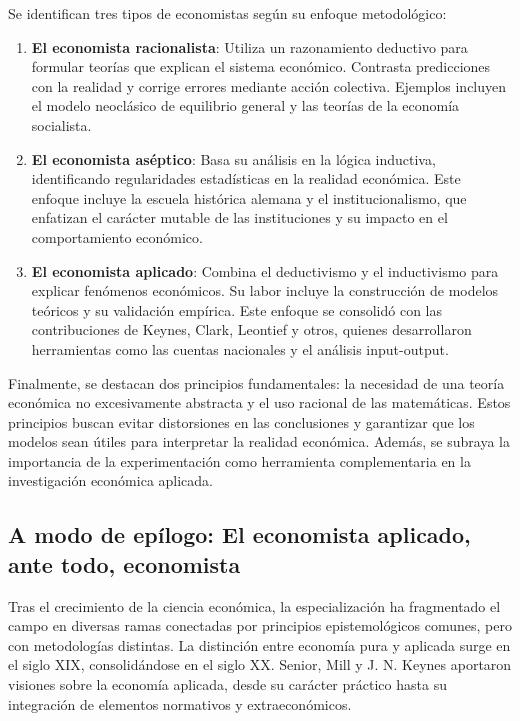 \documentclass[12pt]{report} %
\begin{document}
Se identifican tres tipos de economistas según su enfoque metodológico:

\begin{enumerate}
\def\labelenumi{\arabic{enumi}.}
\item
  \textbf{El economista racionalista}: Utiliza un razonamiento deductivo
  para formular teorías que explican el sistema económico. Contrasta
  predicciones con la realidad y corrige errores mediante acción
  colectiva. Ejemplos incluyen el modelo neoclásico de equilibrio
  general y las teorías de la economía socialista.
\item
  \textbf{El economista aséptico}: Basa su análisis en la lógica
  inductiva, identificando regularidades estadísticas en la realidad
  económica. Este enfoque incluye la escuela histórica alemana y el
  institucionalismo, que enfatizan el carácter mutable de las
  instituciones y su impacto en el comportamiento económico.
\item
  \textbf{El economista aplicado}: Combina el deductivismo y el
  inductivismo para explicar fenómenos económicos. Su labor incluye la
  construcción de modelos teóricos y su validación empírica. Este
  enfoque se consolidó con las contribuciones de Keynes, Clark, Leontief
  y otros, quienes desarrollaron herramientas como las cuentas
  nacionales y el análisis input-output.
\end{enumerate}

Finalmente, se destacan dos principios fundamentales: la necesidad de
una teoría económica no excesivamente abstracta y el uso racional de las
matemáticas. Estos principios buscan evitar distorsiones en las
conclusiones y garantizar que los modelos sean útiles para interpretar
la realidad económica. Además, se subraya la importancia de la
experimentación como herramienta complementaria en la investigación
económica aplicada.

\hypertarget{a-modo-de-epuxedlogo-el-economista-aplicado-ante-todo-economista}{%
\subsection{A modo de epílogo: El economista aplicado, ante todo,
economista}\label{a-modo-de-epuxedlogo-el-economista-aplicado-ante-todo-economista}}

Tras el crecimiento de la ciencia económica, la especialización ha
fragmentado el campo en diversas ramas conectadas por principios
epistemológicos comunes, pero con metodologías distintas. La distinción
entre economía pura y aplicada surge en el siglo XIX, consolidándose en
el siglo XX. Senior, Mill y J. N. Keynes aportaron visiones sobre la
economía aplicada, desde su carácter práctico hasta su integración de
elementos normativos y extraeconómicos.
\end{document}
